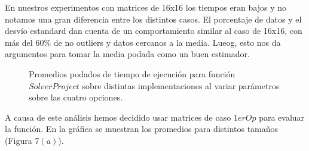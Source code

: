 En nuestros experimentos con matrices de 16x16 los tiempos eran bajos y no notamos una gran diferencia entre los distintos casos.
El porcentaje de datos y el desvío estandard dan cuenta de un comportamiento similar al caso de 16x16, con más del 60$\%$ de no outliers y datos cercanos a la media. Lueog, esto nos da argumentos para tomar la media podada como un buen estimador.
  
 \begin{figure}[htbp]
\centering


\caption{Promedios podados de tiempo de ejecución para función $Solver Project$ sobre distintas implementaciones al variar parámetros sobre las cuatro opciones.} \label{fig:lego}
\end{figure}

A causa de este análisis hemos decidido usar matrices de caso $1erOp$ para evaluar la función. En la gráfica se muestran los promedios para distintos tamaños (Figura 7$(a)$).



